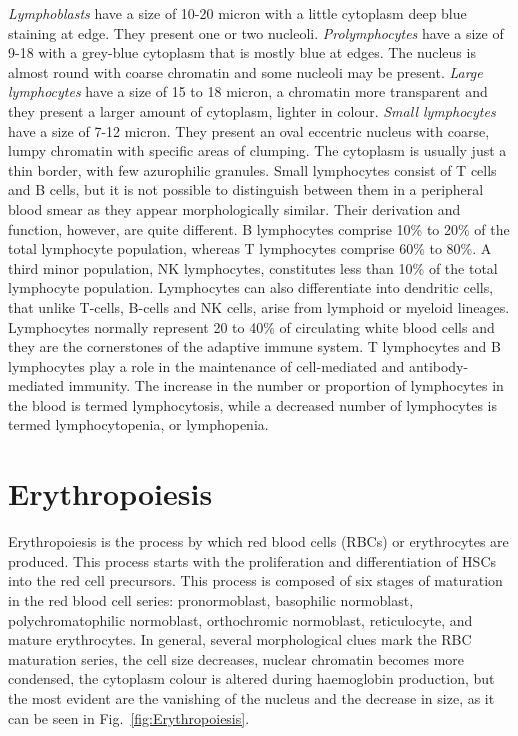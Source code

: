 \documentclass[final,a4paper,12pt,english]{UnicaPhdThesis3}
\begin{document}
\textit{Lymphoblasts} have a size of 10-20 micron with a little cytoplasm deep blue staining at edge. They present one or two nucleoli. \textit{Prolymphocytes} have a size of 9-18 with a grey-blue cytoplasm that is mostly blue at edges. The nucleus is almost round with coarse chromatin and some nucleoli may be present. \textit{Large lymphocytes} have a size of 15 to 18 micron, a chromatin more transparent and they present a larger amount of cytoplasm, lighter in colour. \textit{Small lymphocytes} have a size of 7-12 micron. They present an oval eccentric nucleus with coarse, lumpy chromatin with specific areas of clumping. The cytoplasm is usually just a thin border, with few azurophilic granules. Small lymphocytes consist of T cells and B cells, but it is not possible to distinguish between them in a peripheral blood smear as they appear morphologically similar. Their derivation and function, however, are quite different. B lymphocytes comprise 10\% to 20\% of the total lymphocyte population, whereas T lymphocytes comprise 60\% to 80\%. A third minor population, NK lymphocytes, constitutes less than 10\% of the total lymphocyte population. Lymphocytes can also differentiate into dendritic cells, that unlike T-cells, B-cells and NK cells, arise from lymphoid or myeloid lineages. Lymphocytes normally represent 20 to 40\% of circulating white blood cells and they are the cornerstones of the adaptive immune system. T lymphocytes and B lymphocytes play a role in the maintenance of cell-mediated and antibody-mediated immunity. The increase in the number or proportion of lymphocytes in the blood is termed lymphocytosis, while a decreased number of lymphocytes is termed lymphocytopenia, or lymphopenia.

\section{Erythropoiesis}
Erythropoiesis is the process by which red blood cells (RBCs) or erythrocytes are produced. This process starts with the proliferation and differentiation of HSCs into the red cell precursors. This process is composed of six stages of maturation in the red blood cell series: pronormoblast, basophilic normoblast, polychromatophilic normoblast, orthochromic normoblast, reticulocyte, and mature erythrocytes. In general, several morphological clues mark the RBC maturation series, the cell size decreases, nuclear chromatin becomes more condensed, the cytoplasm colour is altered during haemoglobin production, but the most evident are the vanishing of the nucleus and the decrease in size, as it can be seen in Fig.~\ref{fig:Erythropoiesis}.
\end{document}
